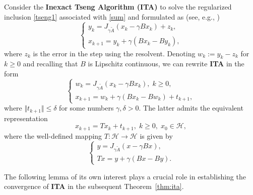 \documentclass[12pt]{article}
\def\beq{\begin{equation}}
\def\eeq{\end{equation}}
\theoremstyle{plain}
\begin{document}
Consider the {\bf Inexact Tseng Algorithm (ITA)} to solve the regularized inclusion \eqref{tseng1} associated with \eqref{sum} and formulated as (see, e.g., \cite{Adeolu,tseng})
$$
\begin{cases}
y_{k}=J_{\gamma \tilde{A}}(x_k-\gamma Bx_k)+z_k,\\
x_{k+1}= y_k+\gamma (Bx_k-By_k),
\end{cases}
$$
where $z_k$ is the error in the step using the resolvent. Denoting $w_k:=y_k-z_k$ for $k\ge 0$ and recalling that $B$ is Lipschitz continuous, we can rewrite {\bf ITA} in the form
$$
\begin{cases}
w_{k}=J_{\gamma \tilde{A}}(x_k-\gamma Bx_k), \;k\ge 0,\\
x_{k+1}= w_k+\gamma (Bx_k-Bw_k)+t_{k+1},
\end{cases}
$$
where $\Vert t_{k+1}\Vert\le \delta$ for some numbers $\gamma, \delta>0$. The latter admits the equivalent representation
$$
x_{k+1}= Tx_k+t_{k+1},\;k\ge 0,\;x_0\in \mathcal{H},
$$
where the well-defined mapping $T: \mathcal{H}\to \mathcal{H}$ is given by
\beq\label{det}
\begin{cases}
y=J_{\gamma \tilde{A}}(x-\gamma Bx),\\
Tx= y+\gamma (Bx-By).
\end{cases}
\eeq

The following lemma of its own interest plays a crucial role in establishing the convergence of {\bf ITA} in the subsequent Theorem~\ref{thm:ita}.
\end{document}
